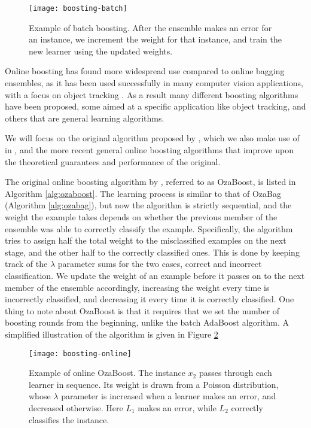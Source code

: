 \begin{figure}
	\centering
	\texttt{[image: boosting-batch]}
	\caption{Example of batch boosting. After the ensemble makes an error for an instance, we
	increment the weight for that instance, and train the new learner using the updated
	weights.}
	\label{fig:boosting-batch}
\end{figure}


Online boosting has found more widespread use compared to online bagging ensembles,
as it has been used successfully in many computer vision applications, with a focus on
object tracking \cite{online-boost-cv4, online-boost-cv, online-boost-cv3, online-boost-cv2, online-boost-cv5, online-boost-cv-6, online-boost-cv-7}.
As a result many different boosting algorithms have been proposed, some aimed at a specific application like object tracking, and others that are general learning algorithms.

We will focus on the original algorithm proposed by \citeauthor{Oza2001online},
which we also make use of in \boostvht,
and the more recent general online boosting algorithms that improve upon the
theoretical guarantees and performance of the original.

The original online boosting algorithm by \citeauthor{Oza2001online}, referred to as
OzaBoost, is listed
in Algorithm \ref{alg:ozaboost}.
The learning process is similar to that of OzaBag (Algorithm \ref{alg:ozabag}), but now the
algorithm is strictly sequential, and the weight the example takes depends on whether
the previous member of the ensemble was able to correctly classify the example.
Specifically, the algorithm tries to assign half the total weight to the misclassified
examples on the next stage, and the other half to the correctly classified ones.
This is done by keeping track of the $\lambda$ parameter sums for the two cases,
correct and incorrect classification. We update the weight of an example
before it passes on to the next member of the ensemble accordingly, increasing
the weight every time is incorrectly classified, and decreasing it every time it
is correctly classified.  One thing to note about OzaBoost is that it requires
that we set the number of boosting rounds from the beginning, unlike the
batch AdaBoost algorithm. A simplified illustration of the algorithm is given
in Figure \ref{fig:boosting-online}


\begin{figure}
	\centering
	\texttt{[image: boosting-online]}
	\caption{Example of online OzaBoost. The instance $x_2$ passes through each learner in sequence.
	Its weight is drawn from a Poisson distribution, whose $\lambda$ parameter is increased
	when a learner makes an error, and decreased otherwise. Here $L_1$ makes an error, while
	$L_2$ correctly classifies the instance.}
	\label{fig:boosting-online}
\end{figure}

